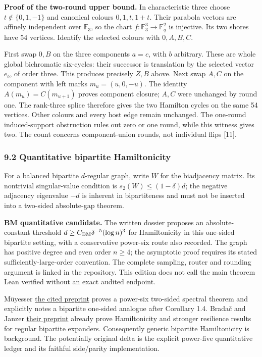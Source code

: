 \documentclass[
  11pt,
]{article}
\begin{document}
\textbf{Proof of the two-round upper bound.} In characteristic three
choose \(t\notin\{0,1,-1\}\) and canonical colours \(0,1,t,1+t\). Their
parabola vectors are affinely independent over \(\mathbb F_3\), so the
chart \(f:\mathbb F_3^3\to\mathbb F_q^2\) is injective. Its two shores
have 54 vertices. Identify the selected colours with \(0,A,B,C\).

First swap \(0,B\) on the three components \(a=c\), with \(b\)
arbitrary. These are whole global bichromatic six-cycles: their
successor is translation by the selected vector \(e_b\), of order three.
This produces precisely \(Z,B\) above. Next swap \(A,C\) on the
component with left marks \(m_u=(u,0,-u)\). The identity
\(A(m_u)=C(m_{u+1})\) proves component closure; \(A,C\) were unchanged
by round one. The rank-three splice therefore gives the two Hamilton
cycles on the same 54 vertices. Other colours and every host edge remain
unchanged. The one-round induced-support obstruction rules out zero or
one round, while this witness gives two. The count concerns
component-union rounds, not individual flips {[}11{]}.

\subsubsection{9.2 Quantitative bipartite
Hamiltonicity}\label{quantitative-bipartite-hamiltonicity}

For a balanced bipartite \(d\)-regular graph, write \(W\) for the
biadjacency matrix. Its nontrivial singular-value condition is
\(s_2(W)\leq(1-\delta)d\); the negative adjacency eigenvalue \(-d\) is
inherent in bipartiteness and must not be inserted into a two-sided
absolute-gap theorem.

\textbf{BM quantitative candidate.} The written dossier proposes an
absolute-constant threshold \(d\geq C_{\rm BM}\delta^{-5}(\log n)^3\)
for Hamiltonicity in this one-sided bipartite setting, with a
conservative power-six route also recorded. The graph has positive
degree and even order \(n\geq4\); the asymptotic proof requires its
stated sufficiently-large-order convention. The complete sampling,
router and rounding argument is linked in the repository. This edition
does not call the main theorem Lean verified without an exact audited
endpoint.

Müyesser \href{https://arxiv.org/html/2609.35766v1}{the cited preprint}
proves a power-six two-sided spectral theorem and explicitly notes a
bipartite one-sided analogue after Corollary 1.4. Bradač and Janzer
\href{https://arxiv.org/html/2605.15043v1}{their preprint} already prove
Hamiltonicity and stronger resilience results for regular bipartite
expanders. Consequently generic bipartite Hamiltonicity is background.
The potentially original delta is the explicit power-five quantitative
ledger and its faithful side/parity implementation.
\end{document}
